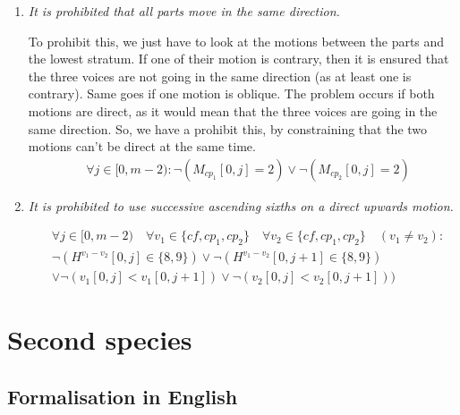 \begin{enumerate}[wide, label=\bfseries 1.P\arabic*]
    \item\label{constraint:same-movement} \reddot \textit{It is prohibited that all parts move in the same direction.}

    To prohibit this, we just have to look at the motions between the parts and the lowest stratum. If one of their motion is contrary, then it is ensured that the three voices are not going in the same direction (as at least one is contrary). Same goes if one motion is oblique. The problem occurs if both motions are direct, as it would mean that the three voices are going in the same direction. So, we have a prohibit this, by constraining that the two motions can't be direct at the same time. 
    \begin{equation} \begin{aligned}
    &\forall j \in [0, m-2) \colon \neg (M_{cp_1}[0, j] = 2) \lor \neg (M_{cp_2}[0, j] = 2)
    \end{aligned} \end{equation}

    \item\label{constraint:ascending-sixths} \reddot \textit{It is prohibited to use successive ascending sixths on a direct upwards motion.}

    \begin{equation} \begin{aligned}
    &\forall j \in [0, m-2)   \quad \forall v_1 \in \{cf, cp_1, cp_2\} \quad \forall v_2 \in \{cf, cp_1, cp_2\} \quad (v_1 \neq v_2) \colon\\
    &\neg (H^{v_1-v_2}[0, j] \in \{8, 9\} ) \lor \neg (H^{v_1-v_2}[0, j+1] \in \{8, 9\})\\
    &\lor \neg (v_1[0,j] < v_1[0,j+1]) \lor \neg (v_2[0,j] < v_2[0,j+1]))
    \end{aligned} \end{equation}
\end{enumerate}


\section{Second species}
\subsection{Formalisation in English}\label{formalisation-en-2nd}
